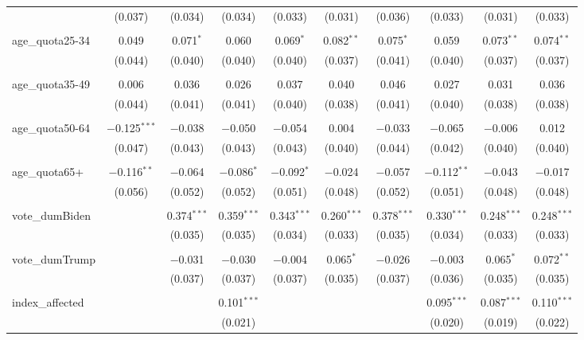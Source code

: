 \begin{tabular}{@{\extracolsep{5pt}}lccccccccc}
  & (0.037) & (0.034) & (0.034) & (0.033) & (0.031) & (0.036) & (0.033) & (0.031) & (0.033) \\ 
  & & & & & & & & & \\ 
 age\_quota25-34 & 0.049 & 0.071$^{*}$ & 0.060 & 0.069$^{*}$ & 0.082$^{**}$ & 0.075$^{*}$ & 0.059 & 0.073$^{**}$ & 0.074$^{**}$ \\ 
  & (0.044) & (0.040) & (0.040) & (0.040) & (0.037) & (0.041) & (0.040) & (0.037) & (0.037) \\ 
  & & & & & & & & & \\ 
 age\_quota35-49 & 0.006 & 0.036 & 0.026 & 0.037 & 0.040 & 0.046 & 0.027 & 0.031 & 0.036 \\ 
  & (0.044) & (0.041) & (0.041) & (0.040) & (0.038) & (0.041) & (0.040) & (0.038) & (0.038) \\ 
  & & & & & & & & & \\ 
 age\_quota50-64 & $-$0.125$^{***}$ & $-$0.038 & $-$0.050 & $-$0.054 & 0.004 & $-$0.033 & $-$0.065 & $-$0.006 & 0.012 \\ 
  & (0.047) & (0.043) & (0.043) & (0.043) & (0.040) & (0.044) & (0.042) & (0.040) & (0.040) \\ 
  & & & & & & & & & \\ 
 age\_quota65+ & $-$0.116$^{**}$ & $-$0.064 & $-$0.086$^{*}$ & $-$0.092$^{*}$ & $-$0.024 & $-$0.057 & $-$0.112$^{**}$ & $-$0.043 & $-$0.017 \\ 
  & (0.056) & (0.052) & (0.052) & (0.051) & (0.048) & (0.052) & (0.051) & (0.048) & (0.048) \\ 
  & & & & & & & & & \\ 
 vote\_dumBiden &  & 0.374$^{***}$ & 0.359$^{***}$ & 0.343$^{***}$ & 0.260$^{***}$ & 0.378$^{***}$ & 0.330$^{***}$ & 0.248$^{***}$ & 0.248$^{***}$ \\ 
  &  & (0.035) & (0.035) & (0.034) & (0.033) & (0.035) & (0.034) & (0.033) & (0.033) \\ 
  & & & & & & & & & \\ 
 vote\_dumTrump &  & $-$0.031 & $-$0.030 & $-$0.004 & 0.065$^{*}$ & $-$0.026 & $-$0.003 & 0.065$^{*}$ & 0.072$^{**}$ \\ 
  &  & (0.037) & (0.037) & (0.037) & (0.035) & (0.037) & (0.036) & (0.035) & (0.035) \\ 
  & & & & & & & & & \\ 
 index\_affected &  &  & 0.101$^{***}$ &  &  &  & 0.095$^{***}$ & 0.087$^{***}$ & 0.110$^{***}$ \\ 
  &  &  & (0.021) &  &  &  & (0.020) & (0.019) & (0.022) \\ 

\end{tabular}
